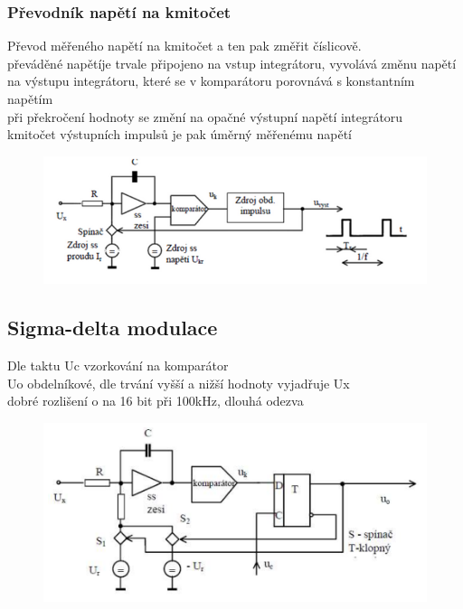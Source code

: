 \subsubsection*{Převodník napětí na kmitočet}
Převod měřeného napětí na kmitočet a ten pak změřit číslicově.\\
převáděné napětíje trvale připojeno na vstup integrátoru, vyvolává změnu napětí na výstupu integrátoru, které se v komparátoru porovnává s konstantním napětím\\
při překročení hodnoty se změní na opačné výstupní napětí integrátoru\\
kmitočet výstupních impulsů je pak úměrný měřenému napětí
\begin{figure}[H]
    \includegraphics*[scale = 1]{images/adc_V_na_f.png}
\end{figure}

\subsection*{Sigma-delta modulace}
Dle taktu Uc vzorkování na komparátor\\
Uo obdelníkové, dle trvání vyšší a nižší hodnoty vyjadřuje Ux\\
dobré rozlišení o na 16 bit při 100kHz, dlouhá odezva
\begin{figure}[H]
    \includegraphics*[scale = 1]{images/adc_sigma_delta_schema.png}
\end{figure}

